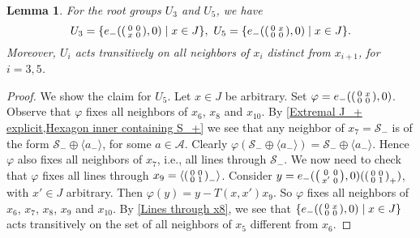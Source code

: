 \documentclass[oneside,a4paper]{amsart} %
\newtheorem{lemma}[theorem]{Lemma}
\theoremstyle{definition}
\newcommand{\A}{\mathcal{A}}
\renewcommand{\SS}{\mathcal{S}}
\numberwithin{equation}{section}
\begin{document}
\begin{lemma}
\label{Hexagon U35}
	For the root groups $U_3$ and $U_5$, we have 
	\[ U_3=\{e_-(\begin{psmallmatrix} 0&0\\x&0 \end{psmallmatrix},0)\mid x\in J\}, \ U_5=\{e_-(\begin{psmallmatrix} 0&x\\0&0 \end{psmallmatrix},0)\mid x\in J\}.\]
	Moreover, $U_i$ acts transitively on all neighbors of $x_i$ distinct from $x_{i+1}$, for $i=3, 5$.
\end{lemma}
\begin{proof}
	We show the claim for $U_5$.
	Let $x\in J$ be arbitrary.
	Set $\varphi=e_-(\begin{psmallmatrix} 0&x\\0&0 \end{psmallmatrix},0)$.
	Observe that $\varphi$ fixes all neighbors of $x_6$, $x_8$ and $x_{10}$.
	By \cref{Extremal J_+ explicit,Hexagon inner containing S_+} we see that any neighbor of $x_7=\SS_-$ is of the form $\SS_-\oplus \langle a_-\rangle$, for some $a\in \A$.
	Clearly $\varphi (\SS_-\oplus \langle a_-\rangle)=\SS_-\oplus \langle a_-\rangle$.
	Hence $\varphi$ also fixes all neighbors of $x_7$, i.e., all lines through $\mathcal S_-$. 
	We now need to check that $\varphi$ fixes all lines through $x_9=\langle \begin{psmallmatrix} 0&0\\0&1 \end{psmallmatrix}_-\rangle $.
	Consider $y=e_-(\begin{psmallmatrix} 0&0\\x'&0 \end{psmallmatrix},0)(\begin{psmallmatrix} 0&0\\0&1 \end{psmallmatrix}_+)$, with $x'\in J$ arbitrary.
	Then $\varphi (y)=y-T(x,x')x_9$.
	So $\varphi$ fixes all neighbors of $x_6$, $x_7$, $x_8$, $x_9$ and $x_{10}$.
	By \cref{Lines through x8}, we see that $\{e_-(\begin{psmallmatrix} 0&x\\0&0 \end{psmallmatrix},0)\mid x\in J\}$ acts transitively on the set of all neighbors of $x_5$ different from $x_6$.
\end{proof}
\end{document}
